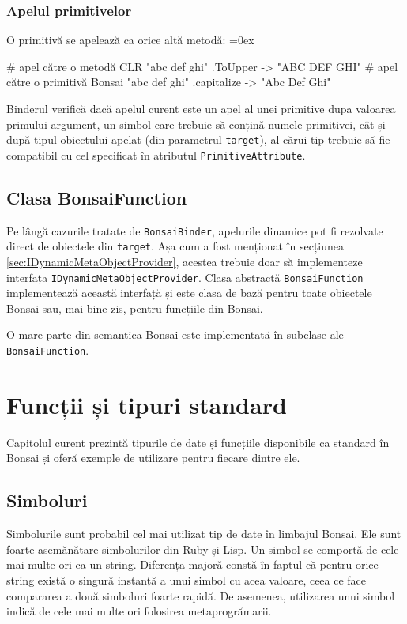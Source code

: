 \documentclass[12pt,a4paper]{memoir}
\renewcommand{\c}{\texttt}
\newenvironment{code}
{
\definecolor{shadecolor}{gray}{0.91}
\topsep=0ex
\relax
\shaded
\verbatim
}
{
\endverbatim
\endshaded
}
\begin{document}
\subsection{Apelul primitivelor}

O primitivă se apelează ca orice altă metodă:
\begin{code}
# apel către o metodă CLR
"abc def ghi" .ToUpper
  -> "ABC DEF GHI"
# apel către o primitivă Bonsai
"abc def ghi" .capitalize
  -> "Abc Def Ghi"
\end{code}

Binderul verifică dacă apelul curent este un apel al unei primitive dupa valoarea primului argument, un simbol care trebuie să conțină numele primitivei, cât și după tipul obiectului apelat (din parametrul \c{target}), al cărui tip trebuie să fie compatibil cu cel specificat în atributul \c{PrimitiveAttribute}.

\section{Clasa BonsaiFunction}

Pe lângă cazurile tratate de \c{BonsaiBinder}, apelurile dinamice pot fi rezolvate direct de obiectele din \c{target}. Așa cum a fost menționat în secțiunea \ref{sec:IDynamicMetaObjectProvider}, acestea trebuie doar să implementeze interfața \c{IDynamicMetaObjectProvider}. Clasa abstractă \c{BonsaiFunction} implementează această interfață și este clasa de bază pentru toate obiectele Bonsai sau, mai bine zis, pentru funcțiile din Bonsai.

O mare parte din semantica Bonsai este implementată în subclase ale \c{BonsaiFunction}. 

\chapter{Funcții și tipuri standard}

Capitolul curent prezintă tipurile de date și funcțiile disponibile ca standard în Bonsai și oferă exemple de utilizare pentru fiecare dintre ele.

\section{Simboluri}

Simbolurile sunt probabil cel mai utilizat tip de date în limbajul Bonsai. Ele sunt foarte asemănătare simbolurilor din Ruby\cite{ruby_symbols} și Lisp\cite{clhs_symbols}. Un simbol se comportă de cele mai multe ori ca un string. Diferența majoră constă în faptul că pentru orice string există o singură instanță a unui simbol cu acea valoare, ceea ce face compararea a două simboluri foarte rapidă. De asemenea, utilizarea unui simbol indică de cele mai multe ori folosirea metaprogrămarii.
\end{document}
